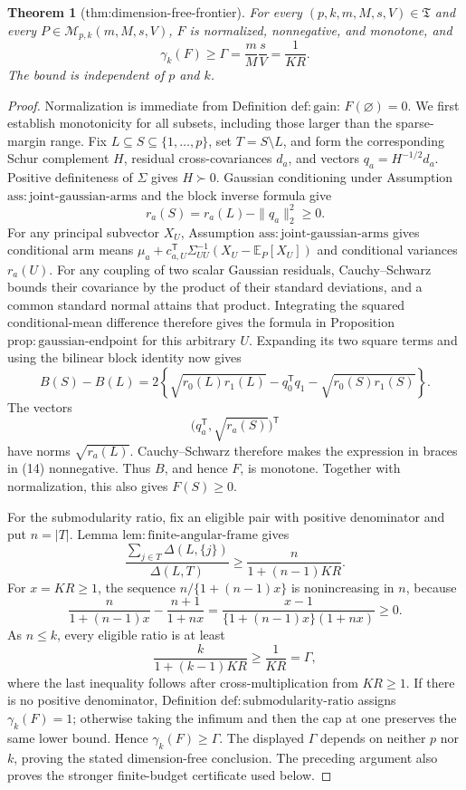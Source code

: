 \documentclass{article}
\newtheorem{theorem}{Theorem}
\begin{document}
\begin{theorem}[thm:dimension-free-frontier]\label{thm:dimension-free-frontier}
For every \((p,k,m,M,s,V)\in\mathfrak T\) and every \(P\in\mathcal M_{p,k}(m,M,s,V)\), \(F\) is normalized, nonnegative, and monotone, and \[\gamma_k(F)\ge\Gamma=\frac{m}{M}\frac{s}{V}=\frac{1}{KR}.\] The bound is independent of \(p\) and \(k\).
\end{theorem}
\begin{proof}
Normalization is immediate from Definition \(\mathrm{def{:}gain}\): \(F(\varnothing)=0\). We first establish monotonicity for all subsets, including those larger than the sparse-margin range. Fix \(L\subseteq S\subseteq\{1,\ldots,p\}\), set \(T=S\setminus L\), and form the corresponding Schur complement \(H\), residual cross-covariances \(d_a\), and vectors \(q_a=H^{-1/2}d_a\). Positive definiteness of \(\Sigma\) gives \(H\succ0\). Gaussian conditioning under Assumption \(\mathrm{ass{:}joint\text{-}gaussian\text{-}arms}\) and the block inverse formula give
\[
 r_a(S)=r_a(L)-\|q_a\|_2^2\ge0.
\]
For any principal subvector \(X_U\), Assumption \(\mathrm{ass{:}joint\text{-}gaussian\text{-}arms}\) gives conditional arm means \(\mu_a+c_{a,U}^{\mathsf T}\Sigma_{UU}^{-1}(X_U-\mathbb E_P[X_U])\) and conditional variances \(r_a(U)\). For any coupling of two scalar Gaussian residuals, Cauchy--Schwarz bounds their covariance by the product of their standard deviations, and a common standard normal attains that product. Integrating the squared conditional-mean difference therefore gives the formula in Proposition \(\mathrm{prop{:}gaussian\text{-}endpoint}\) for this arbitrary \(U\). Expanding its two square terms and using the bilinear block identity now gives
\[
 B(S)-B(L)=2\left\{\sqrt{r_0(L)r_1(L)}
 -q_0^{\mathsf T}q_1-\sqrt{r_0(S)r_1(S)}\right\}. \tag{14}
\]
The vectors
\[
 \bigl(q_a^{\mathsf T},\sqrt{r_a(S)}\bigr)^{\mathsf T}
\]
have norms \(\sqrt{r_a(L)}\). Cauchy--Schwarz therefore makes the expression in braces in (14) nonnegative. Thus \(B\), and hence \(F\), is monotone. Together with normalization, this also gives \(F(S)\ge0\).

For the submodularity ratio, fix an eligible pair with positive denominator and put \(n=|T|\). Lemma \(\mathrm{lem{:}finite\text{-}angular\text{-}frame}\) gives
\[
 \frac{\sum_{j\in T}\Delta(L,\{j\})}{\Delta(L,T)}
 \ge\frac{n}{1+(n-1)KR}.
\]
For \(x=KR\ge1\), the sequence \(n/\{1+(n-1)x\}\) is nonincreasing in \(n\), because
\[
 \frac{n}{1+(n-1)x}-\frac{n+1}{1+nx}
 =\frac{x-1}{\{1+(n-1)x\}(1+nx)}\ge0.
\]
As \(n\le k\), every eligible ratio is at least
\[
 \frac{k}{1+(k-1)KR}\ge\frac1{KR}=\Gamma,
\]
where the last inequality follows after cross-multiplication from \(KR\ge1\). If there is no positive denominator, Definition \(\mathrm{def{:}submodularity\text{-}ratio}\) assigns \(\gamma_k(F)=1\); otherwise taking the infimum and then the cap at one preserves the same lower bound. Hence \(\gamma_k(F)\ge\Gamma\). The displayed \(\Gamma\) depends on neither \(p\) nor \(k\), proving the stated dimension-free conclusion. The preceding argument also proves the stronger finite-budget certificate used below.
\end{proof}
\end{document}
